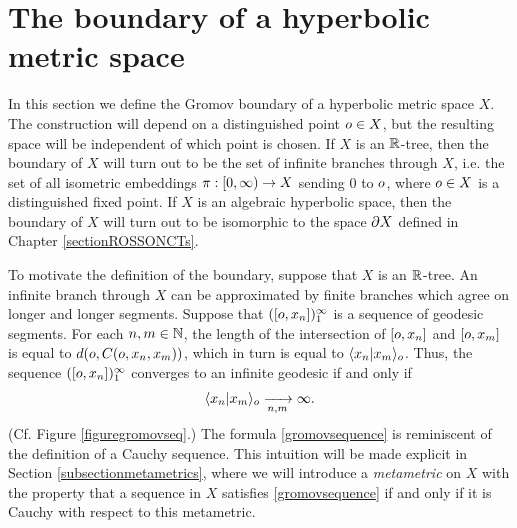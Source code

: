 \bigskip
\section{The boundary of a hyperbolic metric space}
\label{subsectionboundary}

In this section we define the Gromov boundary of a hyperbolic metric space $X$. The construction will depend on a distinguished point $o\in X$, but the resulting space will be independent of which point is chosen. If $X$ is an $\R$-tree, then the boundary of $X$ will turn out to be the set of infinite branches through $X$, i.e. the set of all isometric embeddings $\pi:{[0,\infty)}\to X$ sending $0$ to $o$, where $o\in X$ is a distinguished fixed point. If $X$ is an algebraic hyperbolic space, then the boundary of $X$ will turn out to be isomorphic to the space $\partial X$ defined in Chapter \ref{sectionROSSONCTs}.

To motivate the definition of the boundary, suppose that $X$ is an $\R$-tree. An infinite branch through $X$ can be approximated by finite branches which agree on longer and longer segments. Suppose that $([o,x_n])_1^\infty$ is a sequence of geodesic segments. For each $n,m\in\Namer$, the length of the intersection of $[o,x_n]$ and $[o,x_m]$ is equal to $d(o,C(o,x_n,x_m))$, which in turn is equal to $\langle x_n|x_m\rangle_o$. Thus, the sequence $([o,x_n])_1^\infty$ converges to an infinite geodesic if and only if
\begin{equation}
\label{gromovsequence}
\langle x_n|x_m\rangle_o \xrightarrow[n,m]{} \infty.
\end{equation}
(Cf. Figure \ref{figuregromovseq}.) The formula \eqref{gromovsequence} is reminiscent of the definition of a Cauchy sequence. This intuition will be made explicit in Section \ref{subsectionmetametrics}, where we will introduce a \emph{metametric} on $X$ with the property that a sequence in $X$ satisfies \eqref{gromovsequence} if and only if it is Cauchy with respect to this metametric.

